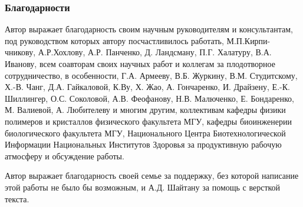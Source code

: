 \begin{frame}
    \frametitle{Благодарности}
    \justifying
Автор выражает благодарность своим научным руководителям и консультантам, под руководством которых автору посчастливилось работать, М.П.Кирпи- чникову, А.Р.Хохлову, А.Р. Панченко, Д. Ландсману, П.Г. Халатуру, В.А. Иванову, всем соавторам своих научных работ и коллегам за плодотворное сотрудничество, в особенности, Г.А. Армееву, В.Б. Журкину, В.М. Студитскому, Х.-В. Чанг, Д.А. Гайкаловой, К.Ву, Х. Жао, А. Гончаренко, И. Драйзену, Е.-К. Шиллингер, О.С. Соколовой, А.В. Феофанову, Н.В. Малюченко, Е. Бондаренко, М. Валиевой, А. Любителеву и многим другим, коллективам кафедры физики полимеров и кристаллов физического факультета МГУ, кафедры биоинженерии биологического факультета МГУ, Национального Центра Биотехнологической Информации Национальных Институтов Здоровья за продуктивную рабочую атмосферу и обсуждение работы.

Автор выражает благодарность своей семье за поддержку, без которой написание этой работы не было бы возможным, и А.Д. Шайтану за помощь с версткой текста.
\end{frame}